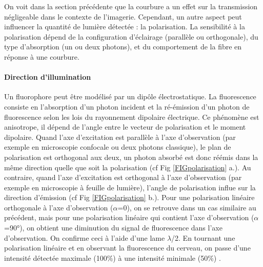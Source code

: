 
On voit dans la section précédente que la courbure a un effet sur la transmission négligeable dans le contexte de l'imagerie. Cependant, un autre aspect peut influencer la quantité de lumière détectée : la polarisation. La sensibilité à la polarisation dépend de la configuration d'éclairage (parallèle ou orthogonale), du type d'absorption (un ou deux photons), et du comportement de la fibre en réponse à une courbure.

\paragraph{Direction d'illumination}

Un fluorophore peut être modélisé par un dipôle électrostatique. La fluorescence consiste en l'absorption d'un photon incident et la ré-émission d'un photon de fluorescence selon les lois du rayonnement dipolaire électrique. Ce phénomène est anisotrope, il dépend de l'angle entre le vecteur de polarisation et le moment dipolaire. Quand l'axe d'excitation est parallèle à l'axe d'observation (par exemple en microscopie confocale ou deux photons classique), le plan de polarisation est orthogonal aux deux, un photon absorbé est donc réémis dans la même direction quelle que soit la polarisation (cf Fig \ref{FIGpolarisation} a.). Au contraire, quand l'axe d'excitation est orthogonal à l'axe d'observation (par exemple en microscopie à feuille de lumière), l'angle de polarisation influe sur la direction d'émission (cf Fig \ref{FIGpolarisation} b.). Pour une polarisation linéaire orthogonale à l'axe d'observation ($\alpha$=0), on se retrouve dans un cas similaire au précédent, mais pour une polarisation linéaire qui contient l'axe d'observation ($\alpha$=90°), on obtient une diminution du signal de fluorescence dans l'axe d'observation.
On confirme ceci à l'aide d'une lame $\lambda$/2. En tournant une polarisation linéaire et en observant la fluorescence du cerveau, on passe d'une intensité détectée maximale (100\%) à une intensité minimale (50\%) \cite{de_vito_effects_2020}.


